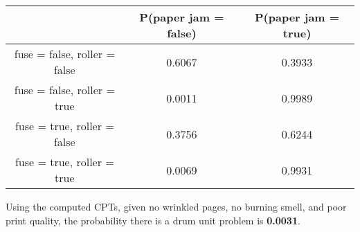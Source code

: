 \begin{table}[h!]
	\begin{tabular}{|c|c|c|}
		\hline
		& P(paper jam = false) & P(paper jam = true) \\ \hline
		fuse = false, roller = false & 0.6067 & 0.3933 \\ \hline
		fuse = false, roller = true & 0.0011 & 0.9989 \\ \hline
		fuse = true, roller = false & 0.3756 & 0.6244 \\ \hline
		fuse = true, roller = true & 0.0069 & 0.9931 \\ \hline
	\end{tabular}
\end{table}

\pagebreak Using the computed CPTs, given no wrinkled pages, no burning smell, and poor print quality, the probability there is a drum unit problem is \textbf{0.0031}.